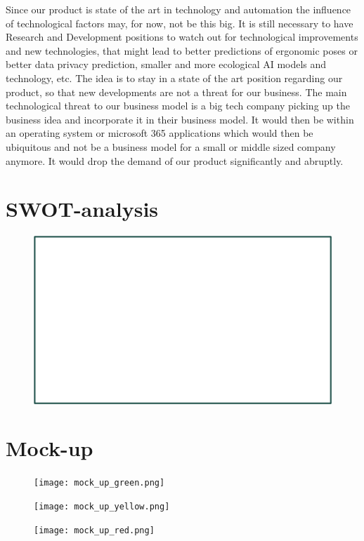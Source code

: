 Since our product is state of the art in technology and automation the influence of technological factors may, for now, not be this big. It is still necessary to have Research and Development positions to watch out for technological improvements and new technologies, that might lead to better predictions of ergonomic poses or better data privacy prediction, smaller and more ecological AI models and technology, etc. The idea is to stay in a state of the art position regarding our product, so that new developments are not a threat for our business.
The main technological threat to our business model is a big tech company picking up the business idea and incorporate it in their business model. It would then be within an operating system or microsoft 365 applications which would then be ubiquitous and not be a business model for a small or middle sized company anymore. It would drop the demand of our product significantly and abruptly. 

\section{SWOT-analysis}

\begin{figure}[h]
    \includegraphics[width=17.5cm]{SWOT_analysis.png}
\end{figure}

\section{Mock-up}

\begin{figure}[h]
    \texttt{[image: mock\_up\_green.png]}
\end{figure}

\begin{figure}[h]
    \texttt{[image: mock\_up\_yellow.png]}
\end{figure}

\begin{figure}[h]
    \texttt{[image: mock\_up\_red.png]}
\end{figure}